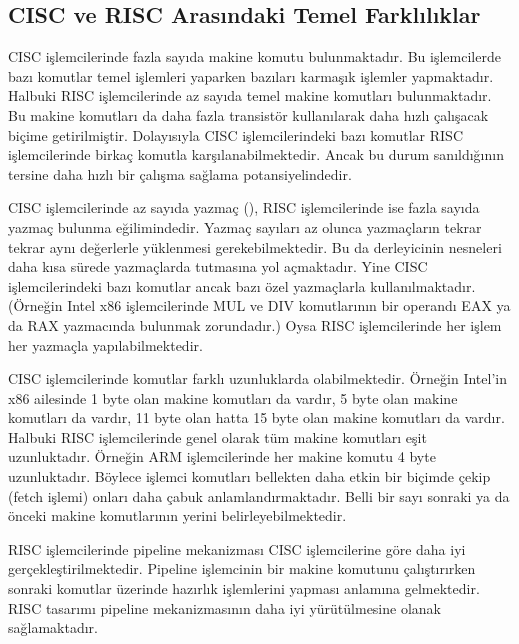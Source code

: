 \documentclass[letterpaper,10pt,turkish]{sphinxmanual}
\begin{document}
\subsection{CISC ve RISC Arasındaki Temel Farklılıklar}
\label{\detokenize{introduction:cisc-ve-risc-arasindaki-temel-farkliliklar}}\begin{description}
\sphinxAtStartPar
CISC işlemcilerinde fazla sayıda makine komutu bulunmaktadır. Bu işlemcilerde bazı komutlar
temel işlemleri yaparken bazıları karmaşık işlemler yapmaktadır. Halbuki RISC işlemcilerinde
az sayıda temel makine komutları bulunmaktadır. Bu makine komutları da daha fazla transistör
kullanılarak daha hızlı çalışacak biçime getirilmiştir. Dolayısıyla CISC işlemcilerindeki bazı
komutlar RISC işlemcilerinde birkaç komutla karşılanabilmektedir. Ancak bu durum sanıldığının
tersine daha hızlı bir çalışma sağlama potansiyelindedir.

\sphinxAtStartPar
CISC işlemcilerinde az sayıda yazmaç (), RISC işlemcilerinde ise fazla sayıda yazmaç
bulunma eğilimindedir. Yazmaç sayıları az olunca yazmaçların tekrar tekrar aynı değerlerle
yüklenmesi gerekebilmektedir. Bu da derleyicinin nesneleri daha kısa sürede yazmaçlarda
tutmasına yol açmaktadır. Yine CISC işlemcilerindeki bazı komutlar ancak bazı özel yazmaçlarla
kullanılmaktadır. (Örneğin Intel x86 işlemcilerinde MUL ve DIV komutlarının bir operandı EAX
ya da RAX yazmacında bulunmak zorundadır.) Oysa RISC işlemcilerinde her işlem her yazmaçla
yapılabilmektedir.

\sphinxAtStartPar
CISC işlemcilerinde komutlar farklı uzunluklarda olabilmektedir. Örneğin Intel’in x86
ailesinde 1 byte olan makine komutları da vardır, 5 byte olan makine komutları da vardır,
11 byte olan hatta 15 byte olan makine komutları da vardır. Halbuki RISC işlemcilerinde genel
olarak tüm makine komutları eşit uzunluktadır. Örneğin ARM işlemcilerinde her makine komutu
4 byte uzunluktadır. Böylece işlemci komutları bellekten daha etkin bir biçimde çekip (fetch
işlemi) onları daha çabuk anlamlandırmaktadır. Belli bir sayı sonraki ya da önceki makine
komutlarının yerini belirleyebilmektedir.

\sphinxAtStartPar
RISC işlemcilerinde pipeline mekanizması CISC işlemcilerine göre daha iyi gerçekleştirilmektedir.
Pipeline işlemcinin bir makine komutunu çalıştırırken sonraki komutlar üzerinde hazırlık
işlemlerini yapması anlamına gelmektedir. RISC tasarımı pipeline mekanizmasının daha iyi
yürütülmesine olanak sağlamaktadır.


\end{description}
\end{document}
